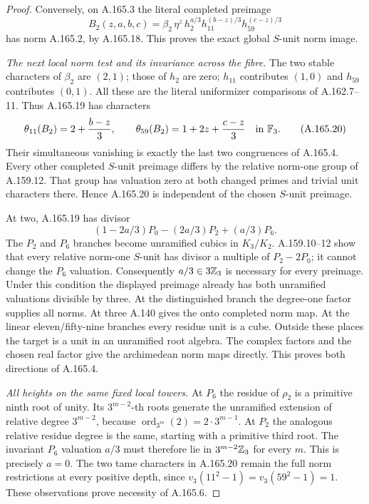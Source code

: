 \begin{proof}
Conversely, on A.165.3 the literal completed preimage
\[
 B_2(z,a,b,c)=
 \beta_2\,\eta^z\,
 h_2^{a/3}h_{11}^{(b-z)/3}h_{59}^{(c-z)/3}
\tag{A.165.19}
\]
has norm A.165.2, by A.165.18.
This proves the exact global \(S\)-unit norm image.

\emph{The next local norm test and its invariance across the fibre.}
The two stable characters of \(\beta_2\) are \((2,1)\);
those of \(h_2\) are zero; \(h_{11}\) contributes \((1,0)\)
and \(h_{59}\) contributes \((0,1)\).  All these are the literal
uniformizer comparisons of A.162.7--11.
Thus A.165.19 has characters
\[
 \theta_{11}(B_2)=2+\frac{b-z}{3},\qquad
 \theta_{59}(B_2)=1+2z+\frac{c-z}{3}
                         \quad\text{in }\mathbb F_3.
\tag{A.165.20}
\]
Their simultaneous vanishing is exactly the last two congruences
of A.165.4.
Every other completed \(S\)-unit preimage differs by the relative
norm-one group of A.159.12.  That group has valuation zero at both
changed primes and trivial unit characters there.  Hence A.165.20
is independent of the chosen \(S\)-unit preimage.

At two, A.165.19 has divisor
\[
       (1-2a/3)P_0-(2a/3)P_2+(a/3)P_6.
\tag{A.165.21}
\]
The \(P_2\) and \(P_6\) branches become unramified cubics in
\(K_3/K_2\).  A.159.10--12 show that every relative norm-one
\(S\)-unit has divisor a multiple of \(P_2-2P_0\); it cannot change
the \(P_6\) valuation.  Consequently \(a/3\in3\mathbb Z_3\) is necessary
for every preimage.  Under this condition the displayed preimage
already has both unramified valuations divisible by three.
At the distinguished branch the degree-one factor supplies all norms.
At three A.140 gives the onto completed norm map.  At the linear
eleven/fifty-nine branches every residue unit is a cube.  Outside
these places the target is a unit in an unramified root algebra.
The complex factors and the chosen real factor give the archimedean
norm maps directly.  This proves both directions of A.165.4.

\emph{All heights on the same fixed local towers.}
At \(P_6\) the residue of \(\rho_2\) is a primitive ninth root of
unity.  Its \(3^{m-2}\)-th roots generate the unramified extension
of relative degree \(3^{m-2}\), because
\(\operatorname{ord}_{3^m}(2)=2\cdot3^{m-1}\).
At \(P_2\) the analogous relative residue degree is the same, starting
with a primitive third root.  The invariant \(P_6\) valuation
\(a/3\) must therefore lie in \(3^{m-2}\mathbb Z_3\) for every \(m\).
This is precisely \(a=0\).
The two tame characters in A.165.20 remain the full norm restrictions
at every positive depth, since \(v_3(11^2-1)=v_3(59^2-1)=1\).
These observations prove necessity of A.165.6.


\end{proof}
